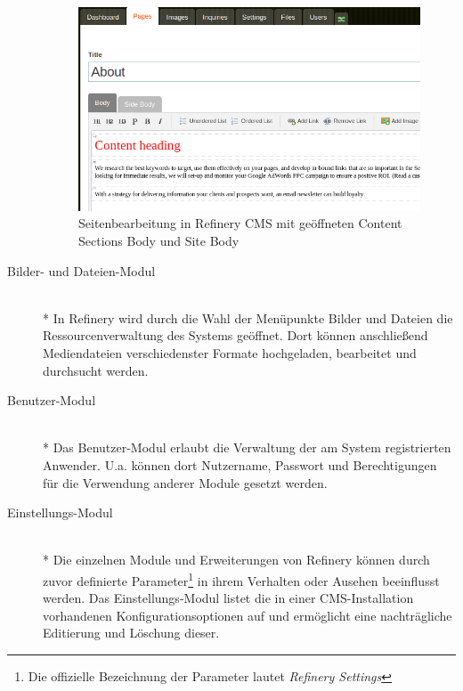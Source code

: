 \begin{description}
\begin{figure}[!h]
\begin{center}
\includegraphics[scale=0.6]{images/analyse/refinery/contentsections.png}
\caption{Seitenbearbeitung in Refinery CMS mit geöffneten Content Sections Body und Site Body}
\label{contentsections}
\end{center}
\end{figure}
\item[Bilder- und Dateien-Modul]\mbox{~}\\*
In Refinery wird durch die Wahl der Menüpunkte Bilder und Dateien die Ressourcenverwaltung des Systems geöffnet. Dort können anschließend 	Mediendateien verschiedenster Formate hochgeladen, bearbeitet und durchsucht werden.
\item[Benutzer-Modul]\mbox{~}\\*
Das Benutzer-Modul erlaubt die Verwaltung der am System registrierten Anwender. U.a. können dort Nutzername, Passwort und Berechtigungen für die Verwendung anderer Module gesetzt werden.
\item[Einstellungs-Modul]\mbox{~}\\*
Die einzelnen Module und Erweiterungen von Refinery können durch zuvor definierte Parameter\footnote{Die offizielle Bezeichnung der Parameter lautet \emph{Refinery Settings}} in ihrem Verhalten oder Ausehen beeinflusst werden. Das Einstellungs-Modul listet die in einer CMS-Installation vorhandenen Konfigurationsoptionen auf und ermöglicht eine nachträgliche Editierung und Löschung dieser.
\end{description}
